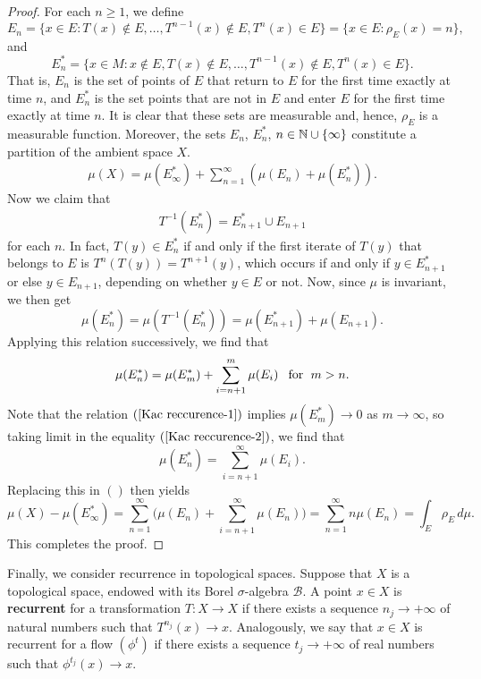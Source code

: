 \begin{proof}
For each $n\geq 1$, we define
\[E_n=\{x\in E:T(x)\notin E,\dots,T^{n-1}(x)\notin E,T^n(x)\in E\}=\{x\in E:\rho_E(x)=n\},\]
and
\[E_n^*=\{x\in M:x\notin E,T(x)\notin E,\dots,T^{n-1}(x)\notin E,T^n(x)\in E\}.\]
That is, $E_n$ is the set of points of $E$ that return to $E$ for the first time exactly at time $n$, and $E_n^*$ is the set points that are not in $E$ and enter $E$ for the first time exactly at time $n$. It is clear that these sets are measurable and, hence, $\rho_E$ is a measurable function. Moreover, the sets $E_n$, $E^*_n$, $n\in\mathbb{N}\cup\{\infty\}$ constitute a partition of the ambient space $X$.
\begin{align}\label{Kac reccurence-1}
\mu(X)=\mu(E_\infty^*)+\sum_{n=1}^{\infty}(\mu(E_n)+\mu(E_n^*)).
\end{align}
Now we claim that
\begin{align}\label{Kac reccurence-2}
T^{-1}(E_n^*)=E_{n+1}^*\cup E_{n+1}
\end{align}
for each $n$. In fact, $T(y)\in E_n^*$ if and only if the first iterate of $T(y)$ that belongs to $E$ is $T^n(T(y))=T^{n+1}(y)$, which occurs if and only if $y\in E_{n+1}^*$ or else $y\in E_{n+1}$, depending on whether $y\in E$ or not. Now, since $\mu$ is invariant, we then get
\[\mu(E_n^*)=\mu(T^{-1}(E_n^*))=\mu(E_{n+1}^*)+\mu(E_{n+1}).\]
Applying this relation successively, we find that
\begin{align}\label{Kac reccurence-3}
\mu(E_n^*)=\mu(E_m^*)+\sum_{i=n+1}^{m}\mu(E_{i})\hspace{8pt}\text{for}\hspace{6pt} m>n.
\end{align}
Note that the relation $(\ref{Kac reccurence-1})$ implies $\mu(E_m^*)\to 0$ as $m\to\infty$, so taking limit in the equality $(\ref{Kac reccurence-2})$, we find that
\[\mu(E_n^*)=\sum_{i=n+1}^{\infty}\mu(E_i).\]
Replacing this in $()$ then yields
\[\mu(X)-\mu(E_\infty^*)=\sum_{n=1}^{\infty}\Big(\mu(E_n)+\sum_{i=n+1}^{\infty}\mu(E_n)\Big)=\sum_{n=1}^{\infty}n\mu(E_n)=\int_E\rho_E\,d\mu.\]
This completes the proof.
\end{proof}
Finally, we consider recurrence in topological spaces. Suppose that $X$ is a topological space, endowed with its Borel $\sigma$-algebra $\mathcal{B}$. A point $x\in X$ is \textbf{recurrent} for a transformation $T:X\to X$ if there exists a sequence $n_j\to+\infty$ of natural numbers such that $T^{n_j}(x)\to x$. Analogously, we say that $x\in X$ is recurrent for a flow $(\phi^t)$ if there exists a sequence $t_j\to+\infty$ of real numbers such that $\phi^{t_j}(x)\to x$.\par
